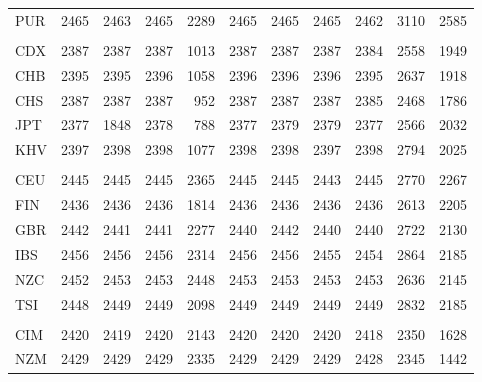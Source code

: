\documentclass[]{report}
\begin{document}
\begin{table}
{\begin{tabular}[t]{lrrrrrrrrrr}
\hspace{1em}PUR & 2465 & 2463 & 2465 & 2289 & 2465 & 2465 & 2465 & 2462 & 3110 & 2585\\
\addlinespace[0.3em]
\multicolumn{11}{l}{\textbf{EAS}}\\
\hspace{1em}CDX & 2387 & 2387 & 2387 & 1013 & 2387 & 2387 & 2387 & 2384 & 2558 & 1949\\
\hspace{1em}CHB & 2395 & 2395 & 2396 & 1058 & 2396 & 2396 & 2396 & 2395 & 2637 & 1918\\
\hspace{1em}CHS & 2387 & 2387 & 2387 & 952 & 2387 & 2387 & 2387 & 2385 & 2468 & 1786\\
\hspace{1em}JPT & 2377 & 1848 & 2378 & 788 & 2377 & 2379 & 2379 & 2377 & 2566 & 2032\\
\hspace{1em}KHV & 2397 & 2398 & 2398 & 1077 & 2398 & 2398 & 2397 & 2398 & 2794 & 2025\\
\addlinespace[0.3em]
\multicolumn{11}{l}{\textbf{EUR}}\\
\hspace{1em}CEU & 2445 & 2445 & 2445 & 2365 & 2445 & 2445 & 2443 & 2445 & 2770 & 2267\\
\hspace{1em}FIN & 2436 & 2436 & 2436 & 1814 & 2436 & 2436 & 2436 & 2436 & 2613 & 2205\\
\hspace{1em}GBR & 2442 & 2441 & 2441 & 2277 & 2440 & 2442 & 2440 & 2440 & 2722 & 2130\\
\hspace{1em}IBS & 2456 & 2456 & 2456 & 2314 & 2456 & 2456 & 2455 & 2454 & 2864 & 2185\\
\hspace{1em}NZC & 2452 & 2453 & 2453 & 2448 & 2453 & 2453 & 2453 & 2453 & 2636 & 2145\\
\hspace{1em}TSI & 2448 & 2449 & 2449 & 2098 & 2449 & 2449 & 2449 & 2449 & 2832 & 2185\\
\addlinespace[0.3em]
\multicolumn{11}{l}{\textbf{POL}}\\
\hspace{1em}CIM & 2420 & 2419 & 2420 & 2143 & 2420 & 2420 & 2420 & 2418 & 2350 & 1628\\
\hspace{1em}NZM & 2429 & 2429 & 2429 & 2335 & 2429 & 2429 & 2429 & 2428 & 2345 & 1442\\

\end{tabular}}
\end{table}
\end{document}
